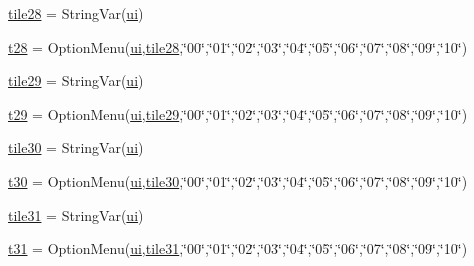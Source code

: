 \begin{DoxyCompactItemize}
\item 
\mbox{\hyperlink{namespacegui_a54e9c1d0531a0815ce07491e16b116f0}{tile28}} = String\+Var(\mbox{\hyperlink{namespacegui_a40ab7281456eadbea2dc2038f5c24fa1}{ui}})
\item 
\mbox{\hyperlink{namespacegui_aa638ea13e25a3927cd4417a1105842b4}{t28}} = Option\+Menu(\mbox{\hyperlink{namespacegui_a40ab7281456eadbea2dc2038f5c24fa1}{ui}},\mbox{\hyperlink{namespacegui_a54e9c1d0531a0815ce07491e16b116f0}{tile28}},\char`\"{}00\char`\"{},\char`\"{}01\char`\"{},\char`\"{}02\char`\"{},\char`\"{}03\char`\"{},\char`\"{}04\char`\"{},\char`\"{}05\char`\"{},\char`\"{}06\char`\"{},\char`\"{}07\char`\"{},\char`\"{}08\char`\"{},\char`\"{}09\char`\"{},\char`\"{}10\char`\"{})
\item 
\mbox{\hyperlink{namespacegui_ab115038ed3d4211efcc93877e730dfbc}{tile29}} = String\+Var(\mbox{\hyperlink{namespacegui_a40ab7281456eadbea2dc2038f5c24fa1}{ui}})
\item 
\mbox{\hyperlink{namespacegui_a342be2f321cfe086e652376fcf209ea1}{t29}} = Option\+Menu(\mbox{\hyperlink{namespacegui_a40ab7281456eadbea2dc2038f5c24fa1}{ui}},\mbox{\hyperlink{namespacegui_ab115038ed3d4211efcc93877e730dfbc}{tile29}},\char`\"{}00\char`\"{},\char`\"{}01\char`\"{},\char`\"{}02\char`\"{},\char`\"{}03\char`\"{},\char`\"{}04\char`\"{},\char`\"{}05\char`\"{},\char`\"{}06\char`\"{},\char`\"{}07\char`\"{},\char`\"{}08\char`\"{},\char`\"{}09\char`\"{},\char`\"{}10\char`\"{})
\item 
\mbox{\hyperlink{namespacegui_af7526ad516cd07f3f2ec75d8b81287a9}{tile30}} = String\+Var(\mbox{\hyperlink{namespacegui_a40ab7281456eadbea2dc2038f5c24fa1}{ui}})
\item 
\mbox{\hyperlink{namespacegui_a24ef5ddefbe8dca48b5e700d68e95a72}{t30}} = Option\+Menu(\mbox{\hyperlink{namespacegui_a40ab7281456eadbea2dc2038f5c24fa1}{ui}},\mbox{\hyperlink{namespacegui_af7526ad516cd07f3f2ec75d8b81287a9}{tile30}},\char`\"{}00\char`\"{},\char`\"{}01\char`\"{},\char`\"{}02\char`\"{},\char`\"{}03\char`\"{},\char`\"{}04\char`\"{},\char`\"{}05\char`\"{},\char`\"{}06\char`\"{},\char`\"{}07\char`\"{},\char`\"{}08\char`\"{},\char`\"{}09\char`\"{},\char`\"{}10\char`\"{})
\item 
\mbox{\hyperlink{namespacegui_a587d16eda380c21d3eddbf1fbc9716ce}{tile31}} = String\+Var(\mbox{\hyperlink{namespacegui_a40ab7281456eadbea2dc2038f5c24fa1}{ui}})
\item 
\mbox{\hyperlink{namespacegui_af8c8f46ca7cb86271e4bca50136a33eb}{t31}} = Option\+Menu(\mbox{\hyperlink{namespacegui_a40ab7281456eadbea2dc2038f5c24fa1}{ui}},\mbox{\hyperlink{namespacegui_a587d16eda380c21d3eddbf1fbc9716ce}{tile31}},\char`\"{}00\char`\"{},\char`\"{}01\char`\"{},\char`\"{}02\char`\"{},\char`\"{}03\char`\"{},\char`\"{}04\char`\"{},\char`\"{}05\char`\"{},\char`\"{}06\char`\"{},\char`\"{}07\char`\"{},\char`\"{}08\char`\"{},\char`\"{}09\char`\"{},\char`\"{}10\char`\"{})

\end{DoxyCompactItemize}
